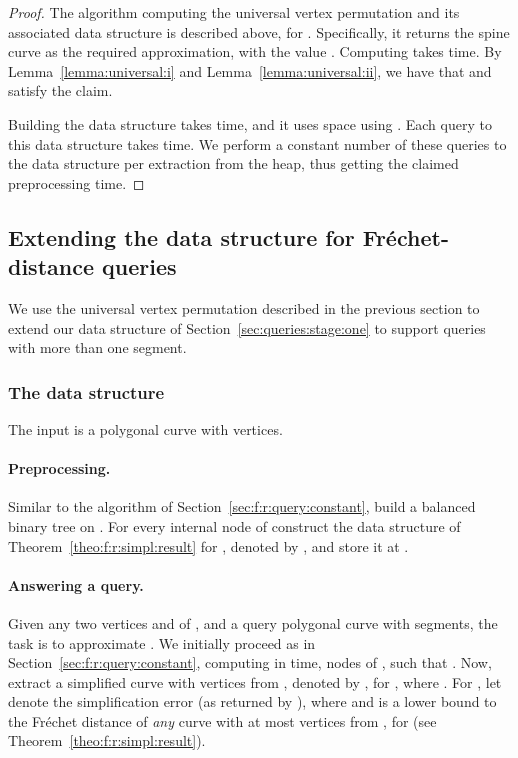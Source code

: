 \documentclass[12pt]{article}
\newcommand{\seclab}[1]{\label{sec:#1}}
\newcommand{\secref}[1]{Section~\ref{sec:#1}}
\newcommand{\thmref}[1]{Theorem~\ref{theo:#1}}
\newcommand{\lemref}[1]{Lemma~\ref{lemma:#1}}
\newcommand{\Frechet}{Fr\'{e}c{h}e{}t\xspace}\providecommand{\Arr}{\mathop{\mathrm{\EuScript{A}}}}
\numberwithin{figure}{section}
\numberwithin{equation}{section}
\begin{document}
\begin{proof}
    The algorithm computing the universal vertex permutation and its
    associated data structure is described above, for .  Specifically, it returns the spine curve
     as the required approximation, with the
    value . Computing  takes  time.
    By \lemref{universal:i} and \lemref{universal:ii}, we have that
     and  satisfy the claim.
    
    Building the data structure takes  time, and
    it uses  space using . Each query to this
    data structure takes  time. We perform a
    constant number of these queries to the data structure per
    extraction from the heap, thus getting the claimed preprocessing
    time.
\end{proof}


\subsection{Extending the data structure for \Frechet-distance queries}
\seclab{k:seg:query}

We use the universal vertex permutation described in the previous
section to extend our data structure of \secref{queries:stage:one} to
support queries with more than one segment.

\subsubsection{The data structure}

The input is a polygonal curve  with  vertices.

\paragraph{Preprocessing.}
Similar to the algorithm of \secref{f:r:query:constant}, build a
balanced binary tree  on . For every internal node 
of  construct the data structure of \thmref{f:r:simpl:result}
for , denoted by , and store it at
.

\paragraph{Answering a query.}
Given any two vertices  and  of , and a query polygonal
curve  with  segments, the task is to approximate
. We initially proceed as in
\secref{f:r:query:constant}, computing in  time,  nodes  of , such that
.  Now, extract a simplified curve
with  vertices from , denoted by
, for , where .  For , let  denote the
simplification error (as returned by ), where
 and
 is a lower bound to the \Frechet distance of \emph{any}
curve with at most  vertices from , for
 (see \thmref{f:r:simpl:result}).
\end{document}
